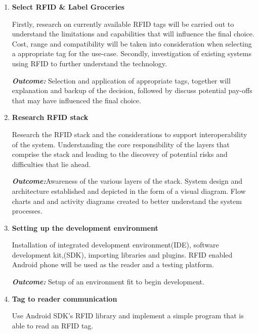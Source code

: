\documentclass[a4paper, 11pt]{article}
\begin{document}
\begin{enumerate}
    \item \textbf{Select RFID \& Label Groceries}
   	\begin{flushleft}Firstly, research on currently available RFID tags will be carried out to understand the limitations and capabilities that will influence the final choice. Cost, range and compatibility will be taken into consideration when selecting a appropriate tag for the use-case. Secondly, investigation of existing systems using RFID to further understand the technology. 
	
	\emph{\textbf{Outcome:}} Selection and application of appropriate tags, together will explanation and backup of the decision, followed by discuss potential pay-offs that may have influenced the final choice.
	  	\end{flushleft}
	  \vspace{\baselineskip}

   \item \textbf{Research RFID stack}
   	\begin{flushleft}Research the RFID stack and the considerations to support interoperability of the system. Understanding the core responsibility of the layers that comprise the stack and leading to the discovery of potential risks and difficulties that lie ahead.
	
	\emph{\textbf{Outcome:}}Awareness of the various layers of the stack. System design and architecture established and depicted in the form of a visual diagram. Flow charts and and activity diagrams created to better understand the system processes. 
	\end{flushleft}
	  \vspace{\baselineskip}
   \item \textbf{Setting up the development environment}
   	\begin{flushleft}Installation of integrated development environment(IDE), software development kit,(SDK), importing libraries and plugins. RFID enabled Android phone will be used as the reader and a testing platform.  
		
		\emph{\textbf{Outcome:}}  Setup of an environment fit to begin development.
		\end{flushleft}
	  \vspace{\baselineskip}
	   \item \textbf{Tag to reader communication}
   	\begin{flushleft}Use Android SDK's RFID library and implement a simple program that is able to read an RFID tag.
		

\end{flushleft}
\end{enumerate}
\end{document}
